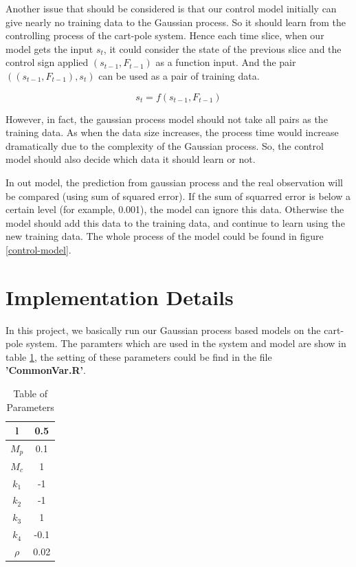 \documentclass[11pt,twoside,a4paper]{article}
\begin{document}
Another issue that should be considered is that our control model
initially can give nearly no training data to the Gaussian process. So
it should learn from the controlling process of the cart-pole
system. Hence each time slice, when our model gets the input
$s_t$, it could consider the state of the previous slice
and the control sign applied $(s_{t-1}, F_{t-1})$ as
a function input. And the pair 
$((s_{t-1}, F_{t-1}), s_t)$
can be used as a pair of training data.
\begin{center}
\begin{equation}
s_t = f(s_{t-1}, F_{t-1})
\end{equation}
\end{center}

However, in fact, the gaussian process model should not take all pairs
as the training data. As when the data size increases, the process
time would increase dramatically due to the complexity of the Gaussian
process. So, the control model should also decide
which data it should learn or not.
 
In out model, the prediction from gaussian process and the real
observation will be compared (using sum of squared error). If the sum
of squarred error is below a certain level (for example, 0.001), the
model can ignore this data. Otherwise the model should add this data
to the training data, and continue to learn using the new training data. The whole process of the model could be
found in figure \ref{control-model}.\\

\section{Implementation Details}
In this project, we basically run our Gaussian process based models on
the cart-pole system. The paramters which are used in the system and
model are show in table \ref{tab:parameters}, the setting of these
parameters could be find in the file \textbf{'CommonVar.R'}.\\

\begin{table}
\centering
\begin{tabular}{c|c}
\hline
l & 0.5  \\ \hline
$M_p$ & 0.1 \\ \hline
$M_c$ & 1  \\ \hline
$k_1$ & -1  \\ \hline
$k_2$ & -1  \\ \hline
$k_3$ & 1  \\ \hline
$k_4$ & -0.1  \\ \hline
$\rho$ & 0.02  \\ \hline
\end{tabular}
\caption{Table of Parameters}
\label{tab:parameters}
\end{table}
\end{document}
